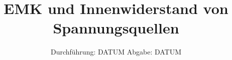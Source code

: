

\subject{V301}
\title{EMK und Innenwiderstand von Spannungsquellen}
\date{
	Durchführung: DATUM
	\hspace{4em}
	Abgabe: DATUM
}


	\maketitle
	\newpage
	\tableofcontents
	\newpage
	
	
	
	
	
	\newpage
	
	\printbibliography

